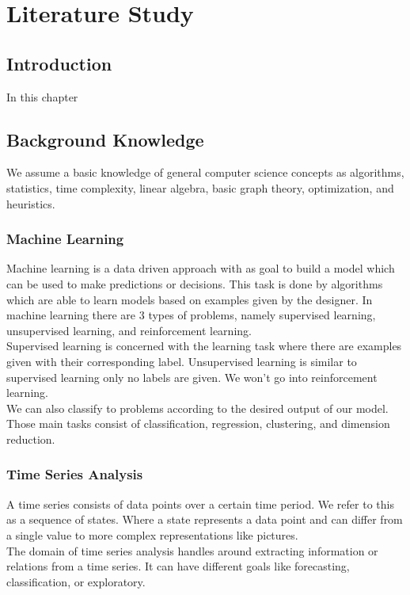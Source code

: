 \graphicspath{ {LiteratureStudyImages/} }


\chapter{Literature Study}
\label{cha:literatureStudy}

\section{Introduction}
In this chapter 


\section{Background Knowledge}
We assume a basic knowledge of general computer science concepts as algorithms, statistics, time complexity, linear algebra, basic graph theory, optimization, and heuristics.


	\subsection{Machine Learning}
Machine learning is a data driven approach with as goal to build a model which can be	used to make predictions or decisions. This task is done by algorithms which are able to learn models based on examples given by the designer. In machine learning there are $3$ types of problems, namely supervised learning, unsupervised learning, and reinforcement learning. \\
Supervised learning is concerned with the learning task where there are examples given with their corresponding label. Unsupervised learning is similar to supervised learning only no labels are given. We won't go into reinforcement learning. \\
We can also classify to problems according to the desired output of our model. Those main tasks consist of classification, regression, clustering, and dimension reduction.
	
	
	\subsection{Time Series Analysis}
A time series consists of data points over a certain time period. We refer to this as a sequence of states. Where a state represents a data point and can differ from a single value to more complex representations like pictures. \\
The domain of time series analysis handles around extracting information or relations from a time series. It can have different goals like forecasting, classification, or exploratory.
	
